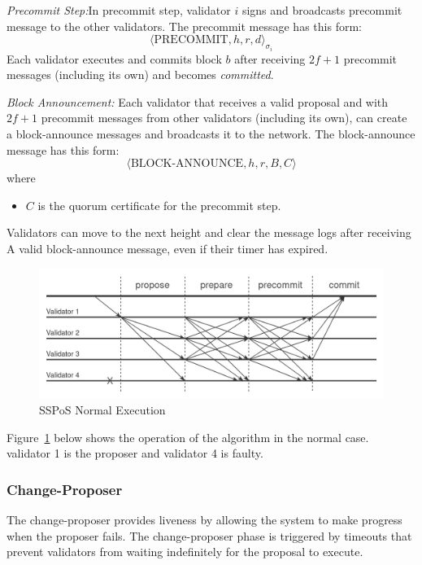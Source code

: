 \documentclass{novel}
\begin{document}
\noindent \emph{Precommit Step:}In precommit step, validator $i$ signs and broadcasts precommit message to the other validators. The precommit message has this form:
\begin{equation*}
  \langle \text{PRECOMMIT},h,r,d \rangle_{\sigma_i}
\end{equation*}
Each validator executes and commits block $b$ after receiving $2f+1$ precommit messages (including its own) and becomes \emph{committed}.

\noindent \emph{Block Announcement:} Each validator that receives a valid proposal and with $2f+1$ precommit messages from other validators (including its own), can create a block-announce messages and broadcasts it to the network. The block-announce message has this form:
\begin{equation*}
  \langle \text{BLOCK-ANNOUNCE} ,h ,r ,B, C \rangle
\end{equation*}
where
\begin{itemize}
  \item $C$ is the quorum certificate for the precommit step.
\end{itemize}
Validators can move to the next height and clear the message logs after receiving A valid block-announce message, even if their timer has expired.

\begin{figure}[!t]
	\centering
	\includegraphics[scale=0.3]{normop.png}
	\caption{SSPoS Normal Execution}
	\label{fig:normop}
	\centering
\end{figure}


Figure~\ref{fig:normop} below shows the operation of the algorithm in the normal case. validator 1 is the proposer and validator 4 is faulty.

\subsubsection{Change-Proposer}
The change-proposer provides liveness by allowing the system to make progress when the proposer fails. The change-proposer phase is triggered by timeouts that prevent validators from waiting indefinitely for the proposal to execute.
\end{document}
